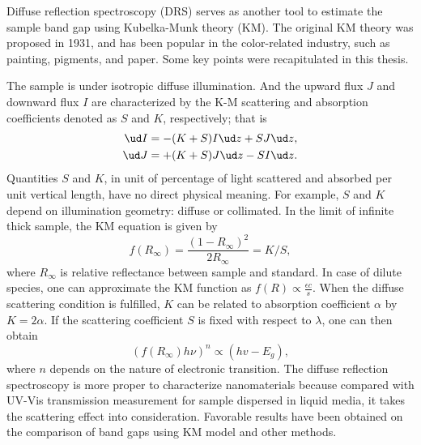 Diffuse reflection spectroscopy (DRS) serves as another tool to estimate the sample band gap using Kubelka-Munk theory (KM).\cite{Tandon1970} The original KM theory was proposed in 1931,\cite{Kubelka1931} and has been popular in the color-related industry, such as painting, pigments, and paper. Some key points were recapitulated in this thesis.

The sample is under isotropic diffuse illumination. And the upward flux $J$ and downward flux $I$ are characterized by the K-M scattering and absorption coefficients denoted as $S$ and $K$, respectively; that is
\begin{align}
\ud I &= - (K + S)I \ud z + SJ\ud z,\\
\ud J &= + (K + S)J \ud z - SI\ud z.
\end{align}
Quantities $S$ and $K$, in unit of percentage of light scattered and absorbed per unit vertical length, have no direct physical meaning. For example, $S$ and $K$ depend on illumination geometry: diffuse or collimated. In the limit of infinite thick sample, the KM equation is given by
\begin{equation}
f(R_\infty) = \frac{(1-R_\infty)^2}{2R_\infty} = K/S,
\end{equation}
where $R_\infty$ is relative reflectance between sample and standard. In case of dilute species, one can approximate the KM function as $f(R) \propto \frac{\epsilon c}{s}$. When the diffuse scattering condition is fulfilled, $K$ can be related to absorption coefficient $\alpha$ by $K = 2\alpha$. If the scattering coefficient $S$ is fixed with respect to $\lambda$, one can then obtain
\begin{equation}
(f(R_\infty) h \nu)^n \propto (hv - E_g),
\end{equation}
where $n$ depends on the nature of electronic transition. The diffuse reflection spectroscopy is more proper to characterize nanomaterials because compared with UV-Vis transmission measurement for sample dispersed in liquid media, it takes the scattering effect into consideration. Favorable results have been obtained on the comparison of band gaps using KM model and other methods.\cite{Tandon1970,Morales2007} 

